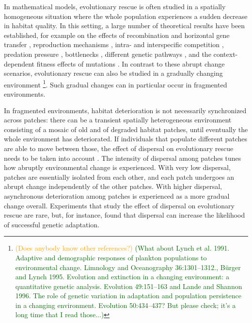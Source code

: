 \documentclass[11pt]{article}
\newcommand{\hildegard}[1]{\textcolor{darkgreen}{(#1)}}
\newcommand{\pete}[1]{\textcolor{orange}{(#1)}}
\newcommand{\chg}[1]{\textcolor{change}{#1}}
\begin{document}
In mathematical models, evolutionary rescue is often studied in a spatially homogeneous situation where the whole population experiences a sudden decrease in habitat quality. In this setting, a large number of theoretical results have been established, for example on the effects of recombination \citep{uecker_2015} and 
horizontal gene transfer \citep{tazzyman_2014}, 
reproduction mechanisms \citep{glemin_2013,uecker_2017}, intra- and interspecific competition \citep{osmond_2013}, predation pressure \citep{yamamichi_2015}, 
bottlenecks \citep{martin_2013}, 
different genetic pathways \citep{osmond_2019}, and the context-dependent fitness effects of mutations \citep{anciaux_2018}. \chg{In contrast to these abrupt change scenarios, evolutionary rescue can also be studied in a gradually changing environment \citep[e.g.][]{osmond_2017}}\footnote{\pete{Does anybody know other references?} \hildegard{What about Lynch et al. 1991. Adaptive and  demographic responses of plankton populations to environmental change. Limnology and Oceanography 36:1301--1312., B{\"u}rger and Lynch 1995. Evolution and extinction in a changing environment: a quantitative genetic analysis. Evolution 49:151--163 and Lande and Shannon 1996. The role of  genetic  variation  in adaptation and population persistence in a changing environment. Evolution 50:434--437? But please check; it's a long time that I read those...}}. 
Such gradual changes can in particular occur in fragmented environments.

In fragmented environments, habitat deterioration is not necessarily synchronized across patches: there can be a transient spatially heterogeneous environment consisting of a mosaic of old and of degraded habitat patches, until eventually the whole environment has deteriorated. If individuals that populate different patches are able to move between those, the effect of dispersal on evolutionary rescue needs to be taken into account \citep{uecker_2014, tomasini_2019}. \chg{The intensity of dispersal among patches tunes how abruptly environmental change is experienced. With very low dispersal, patches are essentially isolated from each other, and each patch undergoes an abrupt change independently of the other patches. With higher dispersal, asynchronous deterioration among patches is experienced as a more gradual change overall.}
Experiments that study the effect of dispersal on evolutionary rescue are rare, but, for instance, \citet{bell_2011} found that  dispersal can increase the likelihood of successful genetic adaptation. 
\end{document}
